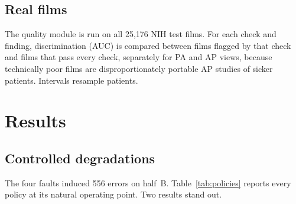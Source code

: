 \documentclass[conference]{IEEEtran}
\begin{document}
\subsection{Real films}
The quality module is run on all 25{,}176 NIH test films. For each check
and finding, discrimination (AUC) is compared between films flagged by that
check and films that pass every check, separately for PA and AP views, because
technically poor films are disproportionately portable AP studies of sicker
patients. Intervals resample patients.

\section{Results}\label{sec:results}

\begin{table}[t]
\caption{Abstention policies on held-out films (half~B, 198 films, controlled
degradations, site-calibrated quality thresholds). ``Induced caught'' is out of
556 degradation-induced errors; ``Unc.\ @ cov.'' is uncertainty-ranked
abstention at the same coverage. ``Clean abst.'' is the fraction of findings
withheld on undegraded films.}
\label{tab:policies}
\centering
\setlength{\tabcolsep}{4pt}%
\end{table}

\subsection{Controlled degradations}
The four faults induced 556 errors on half~B. Table~\ref{tab:policies} reports
every policy at its natural operating point. Two results stand out.
\end{document}
